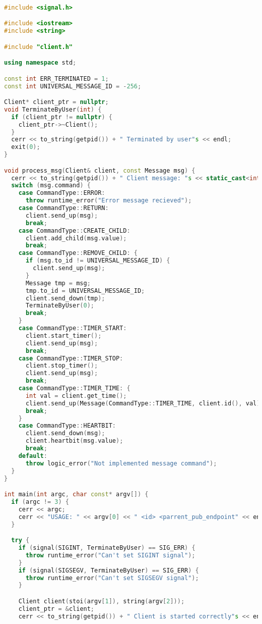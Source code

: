 \begin{lstlisting}[language=C++]

#include <signal.h>

#include <iostream>
#include <string>

#include "client.h"

using namespace std;

const int ERR_TERMINATED = 1;
const int UNIVERSAL_MESSAGE_ID = -256;

Client* client_ptr = nullptr;
void TerminateByUser(int) {
  if (client_ptr != nullptr) {
    client_ptr->~Client();
  }
  cerr << to_string(getpid()) + " Terminated by user"s << endl;
  exit(0);
}

void process_msg(Client& client, const Message msg) {
  cerr << to_string(getpid()) + " Client message: "s << static_cast<int>(msg.command) << " " << msg.to_id << " " << msg.value << endl;
  switch (msg.command) {
    case CommandType::ERROR:
      throw runtime_error("Error message recieved");
    case CommandType::RETURN:
      client.send_up(msg);
      break;
    case CommandType::CREATE_CHILD:
      client.add_child(msg.value);
      break;
    case CommandType::REMOVE_CHILD: {
      if (msg.to_id != UNIVERSAL_MESSAGE_ID) {
        client.send_up(msg);
      }
      Message tmp = msg;
      tmp.to_id = UNIVERSAL_MESSAGE_ID;
      client.send_down(tmp);
      TerminateByUser(0);
      break;
    }
    case CommandType::TIMER_START:
      client.start_timer();
      client.send_up(msg);
      break;
    case CommandType::TIMER_STOP:
      client.stop_timer();
      client.send_up(msg);
      break;
    case CommandType::TIMER_TIME: {
      int val = client.get_time();
      client.send_up(Message(CommandType::TIMER_TIME, client.id(), val));
      break;
    }
    case CommandType::HEARTBIT:
      client.send_down(msg);
      client.heartbit(msg.value);
      break;
    default:
      throw logic_error("Not implemented message command");
  }
}

int main(int argc, char const* argv[]) {
  if (argc != 3) {
    cerr << argc;
    cerr << "USAGE: " << argv[0] << " <id> <parrent_pub_endpoint" << endl;
  }

  try {
    if (signal(SIGINT, TerminateByUser) == SIG_ERR) {
      throw runtime_error("Can't set SIGINT signal");
    }
    if (signal(SIGSEGV, TerminateByUser) == SIG_ERR) {
      throw runtime_error("Can't set SIGSEGV signal");
    }

    Client client(stoi(argv[1]), string(argv[2]));
    client_ptr = &client;
    cerr << to_string(getpid()) + " Client is started correctly"s << endl;


\end{lstlisting}
